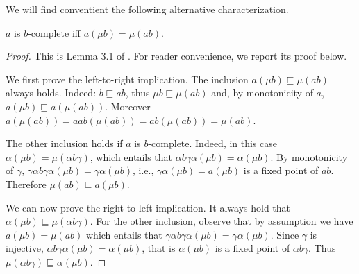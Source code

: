 \documentclass{llncs}
\begin{document}
We will find conventient the following alternative characterization.
\begin{lemma}\label{lemma:alternativecompleteness}
$a$ is $b$-complete iff $a(\mu b) = \mu (a b) $.
\end{lemma}
\begin{proof}
%
This is Lemma 3.1 of \cite{DBLP:journals/jacm/GiacobazziRS00}. For reader convenience, we report its proof below.

We  first prove the left-to-right implication.
The inclusion $a(\mu b) \sqsubseteq \mu (ab)$ always holds. Indeed: $b \sqsubseteq ab$, thus $\mu b \sqsubseteq \mu (ab)$ and, by monotonicity of $a$, 
%
$a(\mu b) \sqsubseteq a(\mu (ab))$. Moreover $a(\mu (ab))=aab(\mu(ab))=ab(\mu(ab))= \mu(ab)$.
%

The other inclusion holds if $a$ is $b$-complete. Indeed, in this case $\alpha(\mu b) = \mu(\alpha b \gamma)$, which entails that $\alpha b \gamma \alpha (\mu b) = \alpha(\mu b)$. By monotonicity of $\gamma$, $\gamma \alpha b \gamma \alpha (\mu b) = \gamma \alpha(\mu b)$, i.e.,  $\gamma \alpha(\mu b) = a(\mu b)$ is a fixed point of $ab$. Therefore $\mu(ab) \sqsubseteq a(\mu b)$.

\medskip

We can now prove the right-to-left implication. It always hold that $\alpha(\mu b) \sqsubseteq \mu (\alpha b \gamma)$. For the other inclusion, observe that by assumption we have $a(\mu b) = \mu (a b) $ which entails that $\gamma \alpha b \gamma \alpha (\mu b)= \gamma \alpha (\mu b)$. Since $\gamma$ is injective, $ \alpha b \gamma \alpha (\mu b)=  \alpha (\mu b)$, that is $\alpha (\mu b)$ is a fixed point of $\alpha b \gamma $. Thus $\mu(\alpha b \gamma) \sqsubseteq \alpha (\mu b)$.
\end{proof}




%
%
\end{document}
